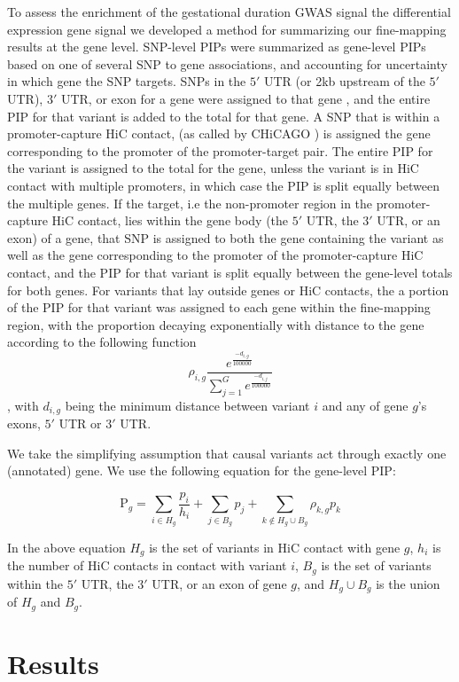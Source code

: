 To assess the enrichment of the gestational duration GWAS signal the differential expression gene signal we developed a method for summarizing our fine-mapping results at the gene level.  SNP-level PIPs were summarized as gene-level
PIPs based on one of several SNP to gene associations, and accounting for uncertainty in which gene the SNP targets.  SNPs in the \(5'\) UTR (or 2kb upstream of the \(5'\) UTR), \(3'\) UTR, or exon for a gene were assigned to that gene
, and the entire PIP for that variant is added to the total for that gene. A SNP that is within a promoter-capture HiC contact, (as called by CHiCAGO \cite{chicago}) is assigned the gene corresponding to the promoter of the
promoter-target pair.  The entire PIP for the variant is assigned to the total for the gene, unless the variant is in HiC contact with multiple promoters, in which case the PIP is split equally between the multiple genes.
If the target, i.e the non-promoter region in the promoter-capture HiC contact, lies within the gene body (the \(5'\) UTR, the \(3'\) UTR, or an exon) of a gene, that SNP is assigned to both the gene containing the variant
as well as the gene corresponding to the promoter of the promoter-capture HiC contact, and the PIP for that variant is split equally between the gene-level totals for both genes.
For variants that lay outside genes or HiC contacts, the a portion of the PIP for that variant was assigned to each gene within the fine-mapping region, with the proportion decaying exponentially with distance to the gene according
to the following function
$$\rho_{i,g}\frac{e^{\frac{-d_{i,g}}{100000}}}{\sum_{j=1}^G e^{\frac{-d_{i,j}}{100000}}}$$, with $d_{i,g}$ being the minimum distance between variant $i$ and any of gene $g$'s exons, \(5'\) UTR or \(3'\) UTR.  

We take the simplifying assumption that causal variants act through exactly one (annotated) gene. We use the following equation for the gene-level PIP:

$$\text{P}_{g} = \sum_{i \in H_g}  \frac{p_i}{h_i} + \sum_{j \in B_g} p_j + \sum_{k \not\in H_g \cup B_g} \rho_{k,g}p_k$$

In the above equation $H_g$ is the set of variants in HiC contact with gene $g$, $h_i$ is the number of HiC contacts in contact with variant $i$, $B_g$ is the set of variants within the \(5'\) UTR, the \(3'\) UTR, or an exon of gene $g$, and $H_g \cup B_g$ is the union of $H_g$ and $B_g$.

\section{Results}\label{sec:orgb8d6bf0}


